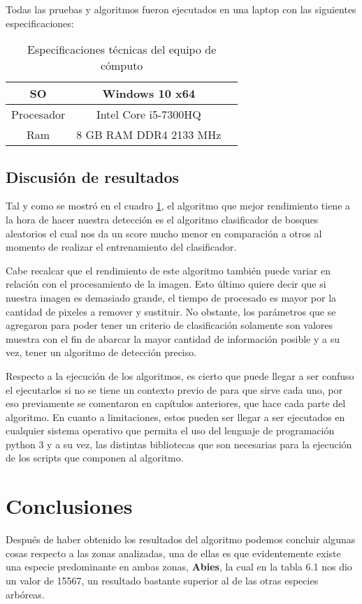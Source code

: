 Todas las pruebas y algoritmos fueron ejecutados en una laptop con las siguientes especificaciones:

\begin{table}[H]
	{\centering
		\begin{tabular}{|c|c|c|}
			\hline
			SO & Windows 10 x64\\
			\hline
			Procesador & Intel Core i5-7300HQ\\
			\hline
			Ram & 8 GB RAM DDR4 2133 MHz\\
			\hline
		\end{tabular}
	\caption{Especificaciones técnicas del equipo de cómputo}
	\label{tab:Especificaciones técnicas del PC}
	}
\end{table}

\break

\section{Discusión de resultados}
Tal y como se mostró en el cuadro \ref{tab:Especificaciones técnicas del PC}, el algoritmo que mejor rendimiento tiene a la hora de hacer nuestra detección es el algoritmo clasificador de bosques aleatorios el cual nos da un score mucho menor en comparación a otros al momento de realizar el entrenamiento del clasificador.

Cabe recalcar que el rendimiento de este algoritmo también puede variar en relación con el procesamiento de la imagen. Esto último quiere decir que si nuestra imagen es demasiado grande, el tiempo de procesado es mayor por la cantidad de pixeles a remover y sustituir. 
No obstante, los parámetros que se agregaron para poder tener un criterio de clasificación solamente son valores muestra con el fin de abarcar la mayor cantidad de información posible y a su vez, tener un algoritmo de detección preciso.

Respecto a la ejecución de los algoritmos, es cierto que puede llegar a ser confuso el ejecutarlos si no se tiene un contexto previo de para que sirve cada uno, por eso previamente se comentaron en capítulos anteriores, que hace cada parte del algoritmo. En cuanto a limitaciones, estos pueden ser llegar a ser ejecutados en cualquier sistema operativo que permita el uso del lenguaje de programación python 3 y a su vez, las distintas bibliotecas que son necesarias para la ejecución de los scripts que componen al algoritmo.


\chapter{Conclusiones}
Después de haber obtenido los resultados del algoritmo podemos concluir algunas cosas respecto a las zonas analizadas, una de ellas es que evidentemente existe una especie predominante en ambas zonas, \textbf{Abies}, la cual en la tabla 6.1 nos dio un valor de 15567, un resultado bastante superior al de las otras especies arbóreas.

